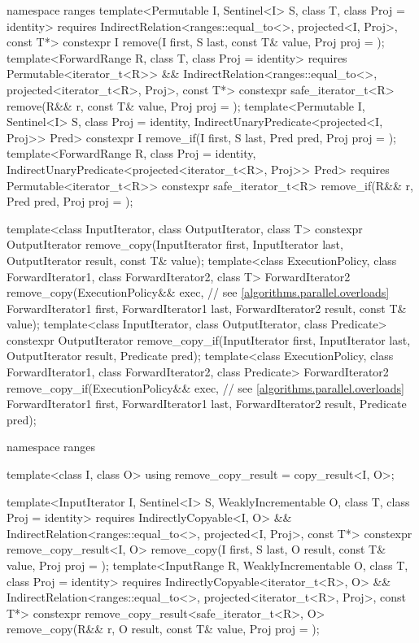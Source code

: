\begin{codeblock}
{  namespace ranges {
    template<Permutable I, Sentinel<I> S, class T, class Proj = identity>
      requires IndirectRelation<ranges::equal_to<>, projected<I, Proj>, const T*>
      constexpr I remove(I first, S last, const T& value, Proj proj = {});
    template<ForwardRange R, class T, class Proj = identity>
      requires Permutable<iterator_t<R>> &&
               IndirectRelation<ranges::equal_to<>, projected<iterator_t<R>, Proj>, const T*>
      constexpr safe_iterator_t<R>
        remove(R&& r, const T& value, Proj proj = {});
    template<Permutable I, Sentinel<I> S, class Proj = identity,
             IndirectUnaryPredicate<projected<I, Proj>> Pred>
      constexpr I remove_if(I first, S last, Pred pred, Proj proj = {});
    template<ForwardRange R, class Proj = identity,
             IndirectUnaryPredicate<projected<iterator_t<R>, Proj>> Pred>
      requires Permutable<iterator_t<R>>
      constexpr safe_iterator_t<R>
        remove_if(R&& r, Pred pred, Proj proj = {});
  }

  template<class InputIterator, class OutputIterator, class T>
    constexpr OutputIterator
      remove_copy(InputIterator first, InputIterator last,
                  OutputIterator result, const T& value);
  template<class ExecutionPolicy, class ForwardIterator1, class ForwardIterator2,
           class T>
    ForwardIterator2
      remove_copy(ExecutionPolicy&& exec, // see \ref{algorithms.parallel.overloads}
                  ForwardIterator1 first, ForwardIterator1 last,
                  ForwardIterator2 result, const T& value);
  template<class InputIterator, class OutputIterator, class Predicate>
    constexpr OutputIterator
      remove_copy_if(InputIterator first, InputIterator last,
                     OutputIterator result, Predicate pred);
  template<class ExecutionPolicy, class ForwardIterator1, class ForwardIterator2,
           class Predicate>
    ForwardIterator2
      remove_copy_if(ExecutionPolicy&& exec, // see \ref{algorithms.parallel.overloads}
                     ForwardIterator1 first, ForwardIterator1 last,
                     ForwardIterator2 result, Predicate pred);

  namespace ranges {
    template<class I, class O>
    using remove_copy_result = copy_result<I, O>;

    template<InputIterator I, Sentinel<I> S, WeaklyIncrementable O, class T,
             class Proj = identity>
      requires IndirectlyCopyable<I, O> &&
               IndirectRelation<ranges::equal_to<>, projected<I, Proj>, const T*>
      constexpr remove_copy_result<I, O>
        remove_copy(I first, S last, O result, const T& value, Proj proj = {});
    template<InputRange R, WeaklyIncrementable O, class T, class Proj = identity>
      requires IndirectlyCopyable<iterator_t<R>, O> &&
               IndirectRelation<ranges::equal_to<>, projected<iterator_t<R>, Proj>, const T*>
      constexpr remove_copy_result<safe_iterator_t<R>, O>
        remove_copy(R&& r, O result, const T& value, Proj proj = {});

}}
\end{codeblock}
